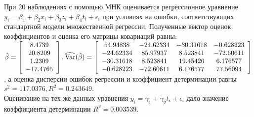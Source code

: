 \documentclass[addpoints, answers]{exam} %
\begin{document}
\begin{questions}
\begin{parts}
\end{parts}
\question При 20 наблюдениях с помощью МНК оценивается регрессионное уравнение $y_i=\beta_1+\beta_2 x_i+\beta_3 z_i+\beta_4 t_i+\epsilon_i$ при условиях на ошибки, соответствующих стандартной модели множественной регрессии. Полученные вектор оценок коэффициентов и оценка его матрицы ковариаций равны:\\
$\hat{\beta}=\left[ \begin{array}{c}
8.4739\\
20.8209\\
1.2309\\
-17.4765
\end{array}\right],
\widehat{\operatorname{Var}}(\hat{\beta})=\left[\begin{array}{cccc}
54.94838 & -24.62334 & -30.31618 & -0.628223\\
-24.62334 & 85.97937 & 8.523841 & -72.60611\\
-30.31618 & 8.523841 & 19.45426 & 6.176577\\
-0.628223 & -72.60611 & 6.176577 & 77.56094
\end{array}\right]$\\, а оценка дисперсии ошибок регрессии и коэффициент детерминации равны $s^2=117.0376, R^2=0.243649$.\\ 
Оценивание на тех же данных уравнения $y_i=\gamma_1+\gamma_2 t_i+\epsilon_i$ дало значение коэффициента детерминации $R^2=0.003539$.
\end{questions}
\end{document}
